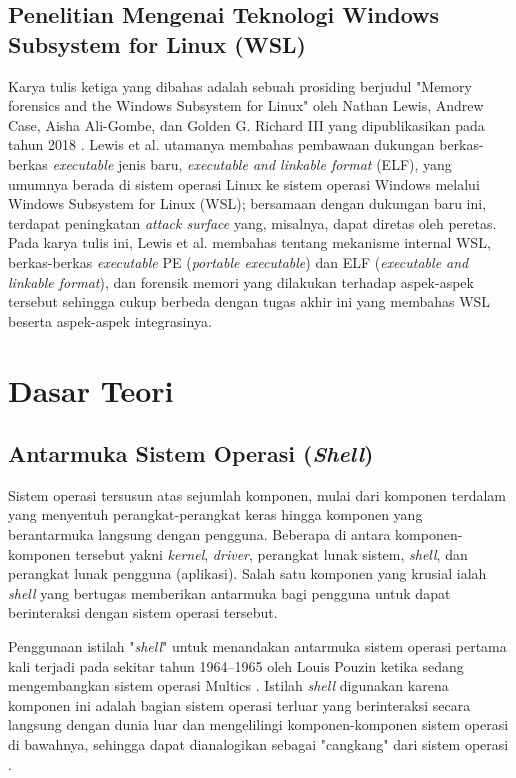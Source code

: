 \subsection{Penelitian Mengenai Teknologi Windows Subsystem for Linux (WSL)}

Karya tulis ketiga yang dibahas adalah sebuah prosiding berjudul "Memory forensics and the Windows Subsystem for Linux" oleh Nathan Lewis, Andrew Case, Aisha Ali-Gombe, dan Golden G. Richard III yang dipublikasikan pada tahun 2018 \cite{lewis2018memory}. Lewis et al. utamanya membahas pembawaan dukungan berkas-berkas \textit{executable} jenis baru, \textit{executable and linkable format} (ELF), yang umumnya berada di sistem operasi Linux ke sistem operasi Windows melalui Windows Subsystem for Linux (WSL); bersamaan dengan dukungan baru ini, terdapat peningkatan \textit{attack surface} yang, misalnya, dapat diretas oleh peretas. Pada karya tulis ini, Lewis et al. membahas tentang mekanisme internal WSL, berkas-berkas \textit{executable} PE (\textit{portable executable}) dan ELF (\textit{executable and linkable format}), dan forensik memori yang dilakukan terhadap aspek-aspek tersebut sehingga cukup berbeda dengan tugas akhir ini yang membahas WSL beserta aspek-aspek integrasinya.

\section{Dasar Teori}

\subsection{Antarmuka Sistem Operasi (\textit{Shell})}

Sistem operasi tersusun atas sejumlah komponen, mulai dari komponen terdalam yang menyentuh perangkat-perangkat keras hingga komponen yang berantarmuka langsung dengan pengguna. Beberapa di antara komponen-komponen tersebut yakni \textit{kernel}, \textit{driver}, perangkat lunak sistem, \textit{shell}, dan perangkat lunak pengguna (aplikasi). Salah satu komponen yang krusial ialah \textit{shell} yang bertugas memberikan antarmuka bagi pengguna untuk dapat berinteraksi dengan sistem operasi tersebut.

Penggunaan istilah "\textit{shell}" untuk menandakan antarmuka sistem operasi pertama kali terjadi pada sekitar tahun 1964--1965 oleh Louis Pouzin ketika sedang mengembangkan sistem operasi Multics \cite{origin-of-the-shell-name}. Istilah \textit{shell} digunakan karena komponen ini adalah bagian sistem operasi terluar yang berinteraksi secara langsung dengan dunia luar dan mengelilingi komponen-komponen sistem operasi di bawahnya, sehingga dapat dianalogikan sebagai "cangkang" dari sistem operasi \cite{shell-jargon-explanation}.

